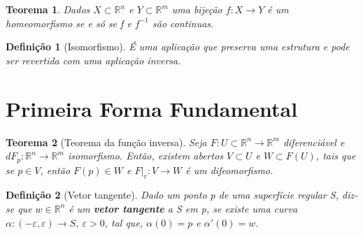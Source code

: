 \documentclass[12pt]{article}
\newtheorem{theorem}{Teorema}
\newtheorem{definition}{Definição}
\begin{document}
\begin{theorem}
Dados $X \subset \mathbb{R}^n$ e $Y \subset \mathbb{R}^m$ uma bijeção $f: X \rightarrow Y$ é um homeomorfismo se e só se f e $f^{-1}$ são continuas.
\end{theorem}

\begin{definition}[Isomorfismo]
É uma aplicação que preserva uma estrutura e pode ser revertida com uma aplicação inversa.
\end{definition}

\section*{Primeira Forma Fundamental}\label{s4}
\begin{theorem}[Teorema da função inversa]
Seja $F: U \subset \mathbb{R}^n \rightarrow \mathbb{R}^m$ diferenciável e $dF_p : \mathbb{R}^n \rightarrow \mathbb{R}^m$ isomorfismo. Então, existem abertos $V \subset U$ e $W \subset F(U)$, tais que se $p \in V$, então $F(p) \in W$ e $F|_v : V \rightarrow W$ é um difeomorfismo.
\end{theorem}

\begin{definition}[Vetor tangente]
Dado um ponto p de uma superfície regular S, diz-se que $w \in \mathbb{R}^n$ é um \textbf{vetor tangente} a S em p, se existe uma curva $\alpha: (- \varepsilon, \varepsilon) \rightarrow S,\ \varepsilon > 0$, tal que, $\alpha(0) = p$ e $\alpha'(0) = w$.
\end{definition}
\end{document}
